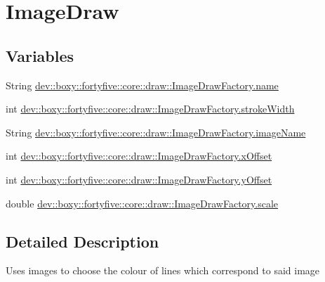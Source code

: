 \hypertarget{group___image_draw}{
\section{ImageDraw}
\label{d8/d0b/group___image_draw}
}
\subsection*{Variables}
\begin{DoxyCompactItemize}
\item 
String \hyperlink{group___image_draw_ga0b4425fc6fc125f08a69acd817b3e928}{dev::boxy::fortyfive::core::draw::ImageDrawFactory.name}
\item 
int \hyperlink{group___image_draw_ga55543d51eec3d277bc6141062937ac94}{dev::boxy::fortyfive::core::draw::ImageDrawFactory.strokeWidth}
\item 
String \hyperlink{group___image_draw_gaebbbe2477cdde233cc84bff269d28bee}{dev::boxy::fortyfive::core::draw::ImageDrawFactory.imageName}
\item 
int \hyperlink{group___image_draw_ga6be37b38c2cff42f387e0357b769f6df}{dev::boxy::fortyfive::core::draw::ImageDrawFactory.xOffset}
\item 
int \hyperlink{group___image_draw_ga7013263410dc0d0e0cfe528ce2f10eed}{dev::boxy::fortyfive::core::draw::ImageDrawFactory.yOffset}
\item 
double \hyperlink{group___image_draw_ga49b6468f905e5801eb9fb81931de7a00}{dev::boxy::fortyfive::core::draw::ImageDrawFactory.scale}
\end{DoxyCompactItemize}


\subsection{Detailed Description}
Uses images to choose the colour of lines which correspond to said image 

